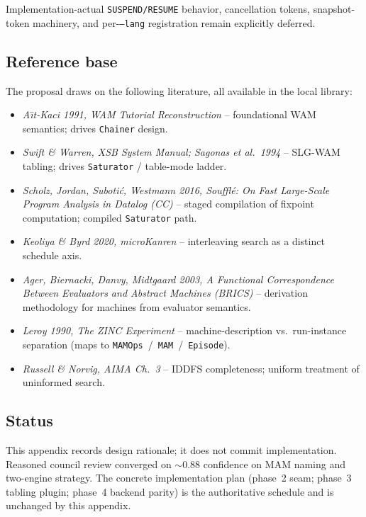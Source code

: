 \documentclass[11pt]{article}
\newcommand{\code}[1]{\texttt{#1}}
\begin{document}
Implementation-actual \code{SUSPEND/RESUME} behavior, cancellation
tokens, snapshot-token machinery, and per-\code{--lang} registration
remain explicitly deferred.

\subsection{Reference base}

The proposal draws on the following literature, all available in the
local library:

\begin{itemize}
\item \emph{A\"{\i}t-Kaci 1991, WAM Tutorial Reconstruction} --
  foundational WAM semantics; drives \code{Chainer} design.
\item \emph{Swift \& Warren, XSB System Manual; Sagonas et al.\ 1994} --
  SLG-WAM tabling; drives \code{Saturator} / table-mode ladder.
\item \emph{Scholz, Jordan, Suboti\'c, Westmann 2016, Soufflé: On Fast
  Large-Scale Program Analysis in Datalog (CC)} -- staged compilation
  of fixpoint computation; compiled \code{Saturator} path.
\item \emph{Keoliya \& Byrd 2020, microKanren} -- interleaving search
  as a distinct schedule axis.
\item \emph{Ager, Biernacki, Danvy, Midtgaard 2003, A Functional
  Correspondence Between Evaluators and Abstract Machines (BRICS)} --
  derivation methodology for machines from evaluator semantics.
\item \emph{Leroy 1990, The ZINC Experiment} -- machine-description
  vs.\ run-instance separation (maps to
  \code{MAMOps}~/~\code{MAM}~/~\code{Episode}).
\item \emph{Russell \& Norvig, AIMA Ch.~3} -- IDDFS completeness;
  uniform treatment of uninformed search.
\end{itemize}

\subsection{Status}

This appendix records design rationale; it does not commit
implementation.  Reasoned council review converged on $\sim$0.88
confidence on MAM naming and two-engine strategy.  The concrete
implementation plan (phase~2 seam; phase~3 tabling plugin;
phase~4 backend parity) is the authoritative schedule and is
unchanged by this appendix.
\end{document}
